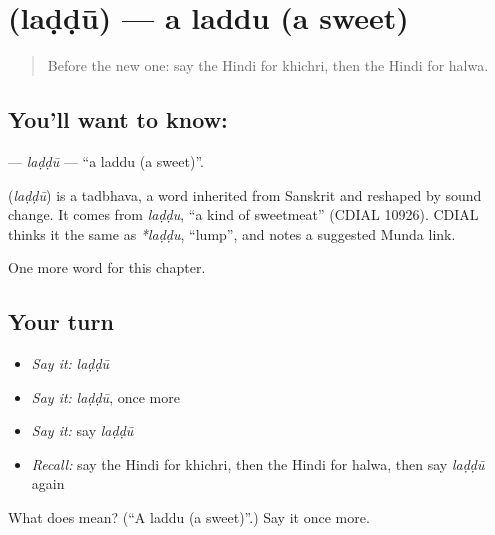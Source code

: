 \section[\texorpdfstring{\hi{लड्डू} (laḍḍū)}{लड्डू (laḍḍū)}]{ (laḍḍū) — a laddu (a sweet)}

\label{lesson:HI-C210-laddu}



\begin{quote}
Before the new one: say the Hindi for khichri, then the Hindi for halwa.
\end{quote}

\subsection*{You'll want to know: }
\textbf{} — \emph{laḍḍū} — \textquotedblleft{}a laddu (a sweet)\textquotedblright{}.

\begin{cousinweb}
\textbf{} (\emph{laḍḍū}) is a tadbhava, a word inherited from Sanskrit and reshaped by sound change. It comes from \emph{laḍḍu}, \textquotedblleft{}a kind of sweetmeat\textquotedblright{} (CDIAL 10926). CDIAL thinks it the same as \emph{*laḍḍu}, \textquotedblleft{}lump\textquotedblright{}, and notes a suggested Munda link.
\end{cousinweb}

\begin{grammarlens}[title={What you've built}]
One more word for this chapter.
\end{grammarlens}

\subsection*{Your turn}
\begin{itemize}
\raggedright
  \item \emph{Say it:} \emph{laḍḍū}
  \item \emph{Say it:} \emph{laḍḍū}, once more
  \item \emph{Say it:} say \emph{laḍḍū}
  \item \emph{Recall:} say the Hindi for khichri, then the Hindi for halwa, then say \emph{laḍḍū} again
\end{itemize}

\begin{tcolorbox}[breakable,colback=teal!4,colframe=teal!35!black,title={Before you move on}]
What does  mean? (\textquotedblleft{}A laddu (a sweet)\textquotedblright{}.) Say it once more.
\end{tcolorbox}
